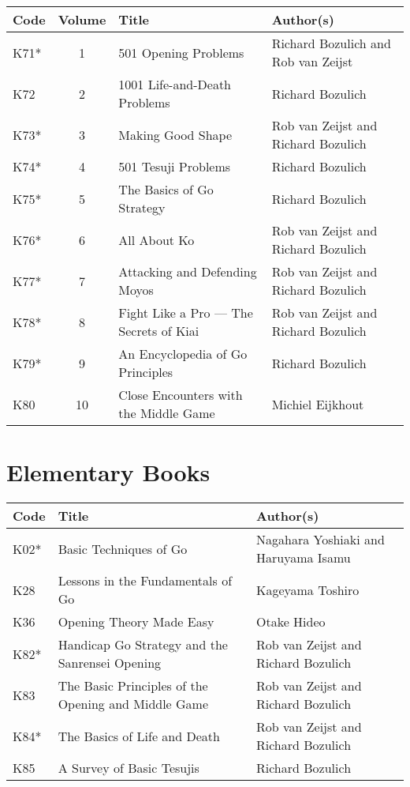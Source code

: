 \begin{longtable}{l|c|p{45mm}|p{25mm}} 
    \hline
    \textbf{Code} & \textbf{Volume} & \textbf{Title} & \textbf{Author(s)} \\
    \hline \hline
    K71* & 1 & 501 Opening Problems & Richard Bozulich and Rob van Zeijst \\
    \hline
    K72 & 2 & 1001 Life-and-Death Problems & Richard Bozulich \\
    \hline
    K73* & 3 & Making Good Shape & Rob van Zeijst and Richard Bozulich \\
    \hline
    K74* & 4 & 501 Tesuji Problems & Richard Bozulich \\
    \hline
    K75* & 5 & The Basics of Go Strategy & Richard Bozulich \\
    \hline
    K76* & 6 & All About Ko & Rob van Zeijst and Richard Bozulich \\
    \hline
    K77* & 7 & Attacking and Defending Moyos & Rob van Zeijst and Richard Bozulich \\
    \hline
    K78* & 8 & Fight Like a Pro --- The Secrets of Kiai & Rob van Zeijst and Richard Bozulich \\
    \hline
    K79* & 9 & An Encyclopedia of Go Principles & Richard Bozulich \\
    \hline
    K80 & 10 & Close Encounters with the Middle Game & Michiel Eijkhout \\
    \hline
\end{longtable}

\pagebreak

\section{Elementary Books}

\begin{longtable}{l|p{45mm}|p{25mm}} 
    \hline
    \textbf{Code} & \textbf{Title} & \textbf{Author(s)} \\
    \hline \hline
    K02* & Basic Techniques of Go & Nagahara Yoshiaki and Haruyama Isamu \\
    \hline
    K28 & Lessons in the Fundamentals of Go & Kageyama Toshiro \\
    \hline
    K36 & Opening Theory Made Easy & Otake Hideo \\
    \hline
    K82* & Handicap Go Strategy and the Sanrensei Opening & Rob van Zeijst and Richard Bozulich \\
    \hline
    K83 & The Basic Principles of the Opening and Middle Game & Rob van Zeijst and Richard Bozulich \\
    \hline
    K84* & The Basics of Life and Death & Rob van Zeijst and Richard Bozulich \\
    \hline
    K85 & A Survey of Basic Tesujis & Richard Bozulich \\
    \hline
\end{longtable}


